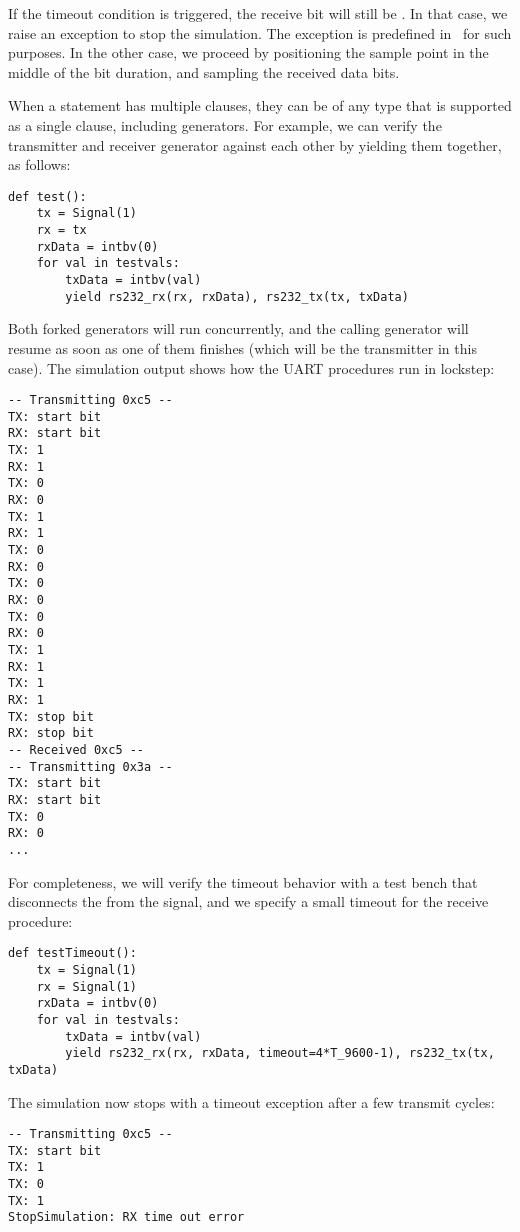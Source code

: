 If the timeout condition is triggered, the receive bit 
will still be . In that case, we raise an exception to stop
the simulation. The  exception is predefined in
\myhdl\ for such purposes. In the other case, we proceed by
positioning the sample point in the middle of the bit duration, and
sampling the received data bits.

When a  statement has multiple clauses, they can be of any
type that is supported as a single clause, including generators. For
example, we can verify the transmitter and receiver generator against
each other by yielding them together, as follows:

\begin{verbatim}
def test():
    tx = Signal(1)
    rx = tx
    rxData = intbv(0)
    for val in testvals:
        txData = intbv(val)
        yield rs232_rx(rx, rxData), rs232_tx(tx, txData)
\end{verbatim}

Both forked generators will run concurrently, and the calling
generator will resume as soon as one of them finishes (which will be
the transmitter in this case).  The simulation output shows how
the UART procedures run in lockstep:

\begin{verbatim}
-- Transmitting 0xc5 --
TX: start bit
RX: start bit
TX: 1
RX: 1
TX: 0
RX: 0
TX: 1
RX: 1
TX: 0
RX: 0
TX: 0
RX: 0
TX: 0
RX: 0
TX: 1
RX: 1
TX: 1
RX: 1
TX: stop bit
RX: stop bit
-- Received 0xc5 --
-- Transmitting 0x3a --
TX: start bit
RX: start bit
TX: 0
RX: 0
...
\end{verbatim}

For completeness, we will verify the timeout behavior with a test
bench that disconnects the  from the  signal, and we
specify a small timeout for the receive procedure:

\begin{verbatim}
def testTimeout():
    tx = Signal(1)
    rx = Signal(1)
    rxData = intbv(0)
    for val in testvals:
        txData = intbv(val)
        yield rs232_rx(rx, rxData, timeout=4*T_9600-1), rs232_tx(tx, txData)
\end{verbatim}
 
The simulation now stops with a timeout exception after a few
transmit cycles:

\begin{verbatim}
-- Transmitting 0xc5 --
TX: start bit
TX: 1
TX: 0
TX: 1
StopSimulation: RX time out error
\end{verbatim}

